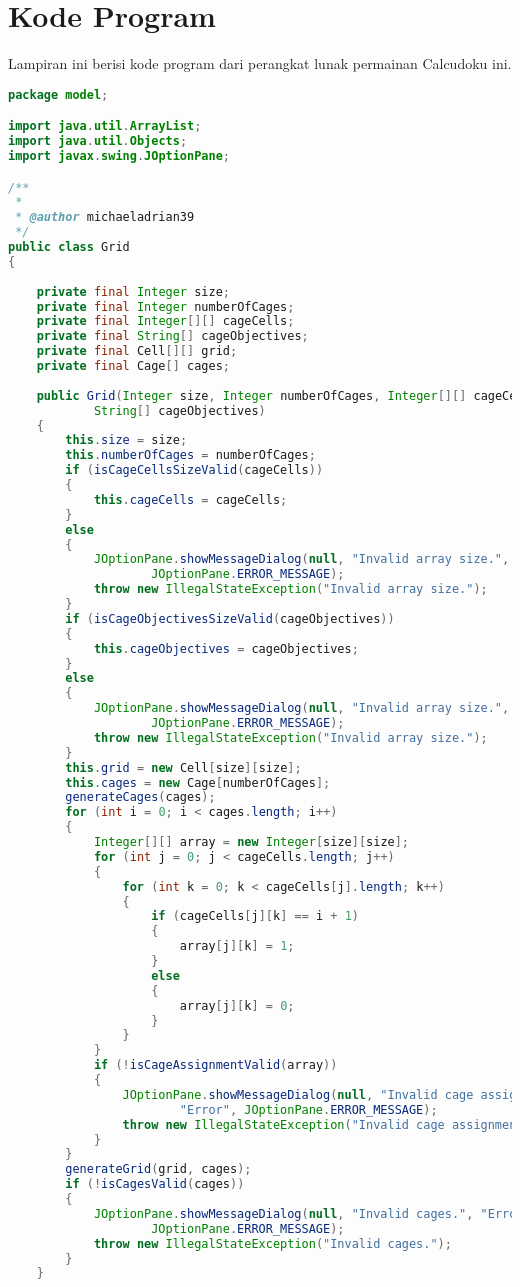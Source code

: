 \chapter{Kode Program}
\label{chap:kodeprogram}

Lampiran ini berisi kode program dari perangkat lunak permainan Calcudoku ini.

\singlespacing 

\begin{lstlisting}[language=Java,basicstyle=\tiny,caption=Grid.java]
package model;

import java.util.ArrayList;
import java.util.Objects;
import javax.swing.JOptionPane;

/**
 *
 * @author michaeladrian39
 */
public class Grid
{
    
    private final Integer size;
    private final Integer numberOfCages;
    private final Integer[][] cageCells;
    private final String[] cageObjectives;
    private final Cell[][] grid;
    private final Cage[] cages;
    
    public Grid(Integer size, Integer numberOfCages, Integer[][] cageCells, 
            String[] cageObjectives)
    {
        this.size = size;
        this.numberOfCages = numberOfCages;
        if (isCageCellsSizeValid(cageCells))
        {
            this.cageCells = cageCells;
        }
        else
        { 
            JOptionPane.showMessageDialog(null, "Invalid array size.", "Error", 
                    JOptionPane.ERROR_MESSAGE);
            throw new IllegalStateException("Invalid array size.");
        }
        if (isCageObjectivesSizeValid(cageObjectives))
        {
            this.cageObjectives = cageObjectives;
        }
        else
        {
            JOptionPane.showMessageDialog(null, "Invalid array size.", "Error", 
                    JOptionPane.ERROR_MESSAGE);
            throw new IllegalStateException("Invalid array size.");
        }
        this.grid = new Cell[size][size];
        this.cages = new Cage[numberOfCages];
        generateCages(cages);
        for (int i = 0; i < cages.length; i++)
        {
            Integer[][] array = new Integer[size][size];
            for (int j = 0; j < cageCells.length; j++)
            {
                for (int k = 0; k < cageCells[j].length; k++)
                {
                    if (cageCells[j][k] == i + 1)
                    {
                        array[j][k] = 1;
                    }
                    else
                    {
                        array[j][k] = 0;
                    }
                }
            }
            if (!isCageAssignmentValid(array))
            { 
                JOptionPane.showMessageDialog(null, "Invalid cage assignment.",
                        "Error", JOptionPane.ERROR_MESSAGE);
                throw new IllegalStateException("Invalid cage assignment.");
            }
        }
        generateGrid(grid, cages);
        if (!isCagesValid(cages))
        {
            JOptionPane.showMessageDialog(null, "Invalid cages.", "Error", 
                    JOptionPane.ERROR_MESSAGE);
            throw new IllegalStateException("Invalid cages.");
        }
    }
    

\end{lstlisting}
